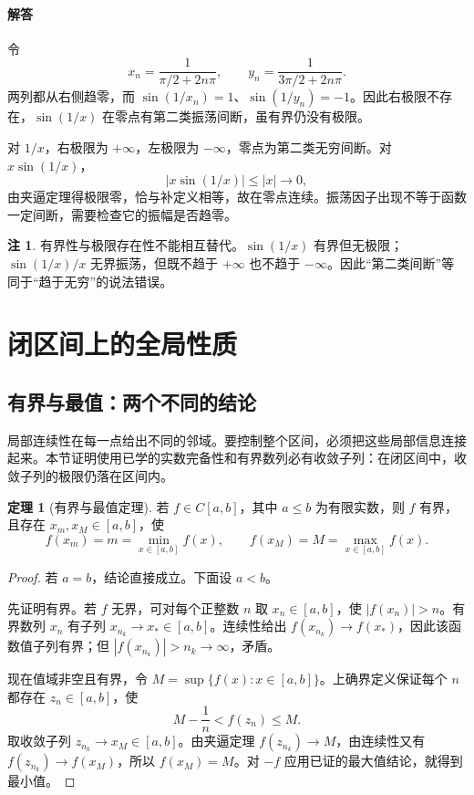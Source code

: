 \documentclass[UTF8,fontset=fandol,12pt,oneside,openany]{ctexrep}
\theoremstyle{definition}
\newtheorem{theorem}{定理}[chapter]
\newtheorem*{remark}{注}
\begin{document}
\paragraph{解答}
令
\[
 x_n=\frac1{\pi/2+2n\pi},\qquad
 y_n=\frac1{3\pi/2+2n\pi}.
\]
两列都从右侧趋零，而 $\sin(1/x_n)=1$、$\sin(1/y_n)=-1$。因此右极限不存在，$\sin(1/x)$ 在零点有第二类振荡间断，虽有界仍没有极限。

对 $1/x$，右极限为 $+\infty$，左极限为 $-\infty$，零点为第二类无穷间断。对 $x\sin(1/x)$，
\[
 |x\sin(1/x)|\le |x|\longrightarrow0,
\]
由夹逼定理得极限零，恰与补定义相等，故在零点连续。振荡因子出现不等于函数一定间断，需要检查它的振幅是否趋零。

\begin{remark}
有界性与极限存在性不能相互替代。$\sin(1/x)$ 有界但无极限；$\sin(1/x)/x$ 无界振荡，但既不趋于 $+\infty$ 也不趋于 $-\infty$。因此“第二类间断”等同于“趋于无穷”的说法错误。
\end{remark}

\section{闭区间上的全局性质}
\label{lec:04:compact}

\subsection{有界与最值：两个不同的结论}
局部连续性在每一点给出不同的邻域。要控制整个区间，必须把这些局部信息连接起来。本节证明使用已学的实数完备性和有界数列必有收敛子列：在闭区间中，收敛子列的极限仍落在区间内。

\begin{theorem}[有界与最值定理]
若 $f\in C[a,b]$，其中 $a\le b$ 为有限实数，则 $f$ 有界，且存在 $x_m,x_M\in[a,b]$，使
\[
 f(x_m)=m=\min_{x\in[a,b]}f(x),\qquad
 f(x_M)=M=\max_{x\in[a,b]}f(x).
\]
\end{theorem}
\begin{proof}
若 $a=b$，结论直接成立。下面设 $a<b$。

先证明有界。若 $f$ 无界，可对每个正整数 $n$ 取 $x_n\in[a,b]$，使 $|f(x_n)|>n$。有界数列 $x_n$ 有子列 $x_{n_k}\to x_*\in[a,b]$。连续性给出 $f(x_{n_k})\to f(x_*)$，因此该函数值子列有界；但 $|f(x_{n_k})|>n_k\to\infty$，矛盾。

现在值域非空且有界，令 $M=\sup\{f(x):x\in[a,b]\}$。上确界定义保证每个 $n$ 都存在 $z_n\in[a,b]$，使
\[
 M-\frac1n<f(z_n)\le M.
\]
取收敛子列 $z_{n_k}\to x_M\in[a,b]$。由夹逼定理 $f(z_{n_k})\to M$，由连续性又有 $f(z_{n_k})\to f(x_M)$，所以 $f(x_M)=M$。对 $-f$ 应用已证的最大值结论，就得到最小值。
\end{proof}
\end{document}
